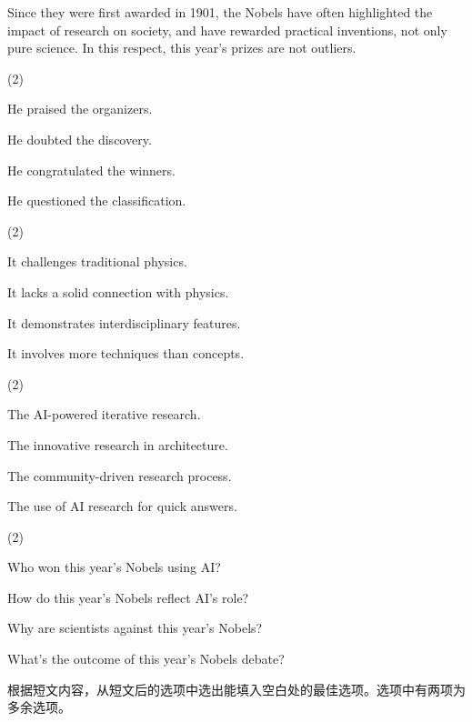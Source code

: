 \documentclass{英语试卷}
\begin{document}
\par Since they were first awarded in 1901, the Nobels have often highlighted the impact of research on society, and have rewarded practical inventions, not only pure science. In this respect, this year's prizes are not outliers.\par
{}
\begin{choices}(2)
  \item He praised the organizers.
  \item He doubted the discovery.
  \item He congratulated the winners.
  \item He questioned the classification.
\end{choices}
\begin{choices}(2)
  \item It challenges traditional physics.
  \item It lacks a solid connection with physics.
  \item It demonstrates interdisciplinary features.
  \item It involves more techniques than concepts.
\end{choices}
\begin{choices}(2)
  \item The AI-powered iterative research.
  \item The innovative research in architecture.
  \item The community-driven research process.
  \item The use of AI research for quick answers.
\end{choices}
\begin{choices}(2)
  \item Who won this year's Nobels using AI?
  \item How do this year's Nobels reflect AI's role?
  \item Why are scientists against this year's Nobels?
  \item What's the outcome of this year's Nobels debate?
\end{choices}
\par 根据短文内容，从短文后的选项中选出能填入空白处的最佳选项。选项中有两项为多余选项。\par
\end{document}
